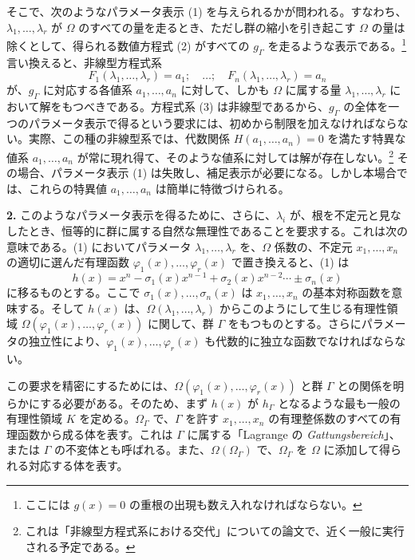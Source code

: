 そこで、次のようなパラメータ表示 (1) を与えられるかが問われる。すなわち、$\lambda_1,
\ldots,\lambda_r$ が $\Omega$ のすべての量を走るとき、ただし群の縮小を引き起こす $\Omega$ の量は除くとして、得られる数値方程式 (2) がすべての $g_\Gamma$ を走るような表示である。\footnote{ここには $g(x)=0$ の重根の出現も数え入れなければならない。} 言い換えると、非線型方程式系
\begin{equation}\tag{3}
F_1(\lambda_1,
\ldots,\lambda_r)=a_1;\quad \ldots;\quad F_n(\lambda_1,
\ldots,\lambda_r)=a_n
\end{equation}
が、$g_\Gamma$ に対応する各値系 $a_1,
\ldots,a_n$ に対して、しかも $\Omega$ に属する量 $\lambda_1,
\ldots,\lambda_r$ において解をもつべきである。方程式系 (3) は非線型であるから、$g_\Gamma$ の全体を一つのパラメータ表示で得るという要求には、初めから制限を加えなければならない。実際、この種の非線型系では、代数関係 $H(a_1,
\ldots,a_n)=0$ を満たす特異な値系 $a_1,
\ldots,a_n$ が常に現れ得て、そのような値系に対しては解が存在しない。\footnote{これは「非線型方程式系における交代」についての論文で、近く一般に実行される予定である。} その場合、パラメータ表示 (1) は失敗し、補足表示が必要になる。しかし本場合では、これらの特異値 $a_1,
\ldots,a_n$ は簡単に特徴づけられる。

\textbf{2.} このようなパラメータ表示を得るために、さらに、$\lambda_i$ が、根を不定元と見なしたとき、恒等的に群に属する自然な無理性であることを要求する。これは次の意味である。(1) においてパラメータ $\lambda_1,
\ldots,\lambda_r$ を、$\Omega$ 係数の、不定元 $x_1,
\ldots,x_n$ の適切に選んだ有理函数 $\varphi_1(x),\ldots,\varphi_r(x)$ で置き換えると、(1) は
\begin{equation}\tag{4}
h(x)=x^n-\sigma_1(x)x^{n-1}+\sigma_2(x)x^{n-2}\cdots \pm \sigma_n(x)
\end{equation}
に移るものとする。ここで $\sigma_1(x),\ldots,\sigma_n(x)$ は $x_1,
\ldots,x_n$ の基本対称函数を意味する。そして $h(x)$ は、$\Omega(\lambda_1,
\ldots,\lambda_r)$ からこのようにして生じる有理性領域 $\Omega(\varphi_1(x),\ldots,\varphi_r(x))$ に関して、群 $\Gamma$ をもつものとする。さらにパラメータの独立性により、$\varphi_1(x),\ldots,\varphi_r(x)$ も代数的に独立な函数でなければならない。

この要求を精密にするためには、$\Omega(\varphi_1(x),\ldots,\varphi_r(x))$ と群 $\Gamma$ との関係を明らかにする必要がある。そのため、まず $h(x)$ が $h_\Gamma$ となるような最も一般の有理性領域 $K$ を定める。$\Omega_\Gamma$ で、$\Gamma$ を許す $x_1,
\ldots,x_n$ の有理整係数のすべての有理函数から成る体を表す。これは $\Gamma$ に属する「Lagrange の \emph{Gattungsbereich}」、または $\Gamma$ の不変体とも呼ばれる。また、$\Omega(\Omega_\Gamma)$ で、$\Omega_\Gamma$ を $\Omega$ に添加して得られる対応する体を表す。

